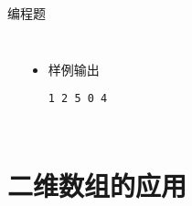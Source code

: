 \begin{frame}[fragile]
{{\begin{exampleblock}{编程题}
\begin{columns}[onlytextwidth,T]
\begin{itemize}
                    \end{itemize}

                    \begin{itemize}
                        \item 样例输出

                            \lstinline|1 2 5 0 4|

                    \end{itemize}
                \end{columns}

            \end{exampleblock}
        }
    }
\end{frame}


\section{二维数组的应用}

